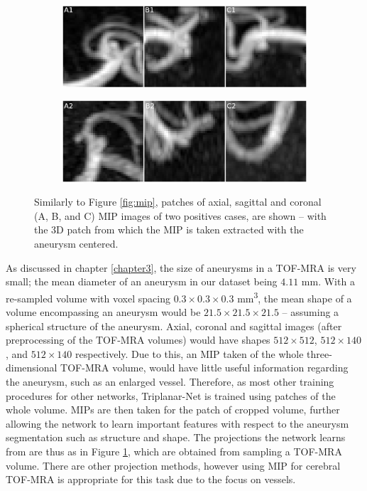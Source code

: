 \begin{figure}[t]
	\centering
	\begin{subfigure}{\linewidth}
		\includegraphics[width=\linewidth]{figures/mip_patch10021.png}
	\end{subfigure}
	\begin{subfigure}{\linewidth}
		\includegraphics[width=\linewidth]{figures/mip_patch10028.png}
	\end{subfigure}
	\caption[Patches of Maximum Intensity Projections of two positive cases.]{Similarly to Figure \ref{fig:mip}, patches of axial, sagittal and coronal (A, B, and C) MIP images of two positives cases, are shown -- with the 3D patch from which the MIP is taken extracted with the aneurysm centered.}
	\label{fig:mip_patch}
\end{figure}


As discussed in chapter \ref{chapter3}, the size of aneurysms in a TOF-MRA is very small; the mean diameter of an aneurysm in our dataset being $4.11$ mm. With a re-sampled volume with voxel spacing $0.3 \times 0.3 \times 0.3$ mm\textsuperscript{3}, the mean shape of a volume encompassing an aneurysm would be $21.5 \times 21.5 \times 21.5$ -- assuming a spherical structure of the aneurysm. Axial, coronal and sagittal images (after preprocessing of the TOF-MRA volumes) would have shapes $512 \times 512$, $512 \times 140$, and $512 \times 140$ respectively. Due to this, an MIP taken of the whole three-dimensional TOF-MRA volume, would have little useful information regarding the aneurysm, such as an enlarged vessel. Therefore, as most other training procedures for other networks, Triplanar-Net is trained using patches of the whole volume. MIPs are then taken for the patch of cropped volume, further allowing the network to learn important features with respect to the aneurysm segmentation such as structure and shape. The projections the network learns from are thus as in Figure \ref{fig:mip_patch}, which are obtained from sampling a TOF-MRA volume. There are other projection methods, however using MIP for cerebral TOF-MRA is appropriate for this task due to the focus on vessels. 


